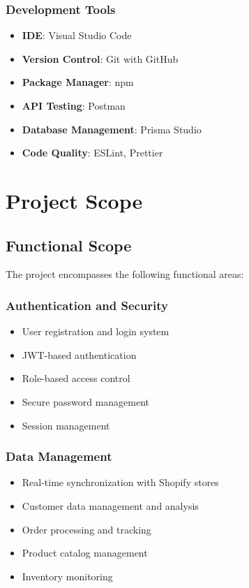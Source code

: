 \documentclass[12pt]{article}
\begin{document}
\subsubsection{Development Tools}
\begin{itemize}
    \item \textbf{IDE}: Visual Studio Code
    \item \textbf{Version Control}: Git with GitHub
    \item \textbf{Package Manager}: npm
    \item \textbf{API Testing}: Postman
    \item \textbf{Database Management}: Prisma Studio
    \item \textbf{Code Quality}: ESLint, Prettier
\end{itemize}

\section{Project Scope}

\subsection{Functional Scope}
The project encompasses the following functional areas:

\subsubsection{Authentication and Security}
\begin{itemize}
    \item User registration and login system
    \item JWT-based authentication
    \item Role-based access control
    \item Secure password management
    \item Session management
\end{itemize}

\subsubsection{Data Management}
\begin{itemize}
    \item Real-time synchronization with Shopify stores
    \item Customer data management and analysis
    \item Order processing and tracking
    \item Product catalog management
    \item Inventory monitoring
\end{itemize}
\end{document}
